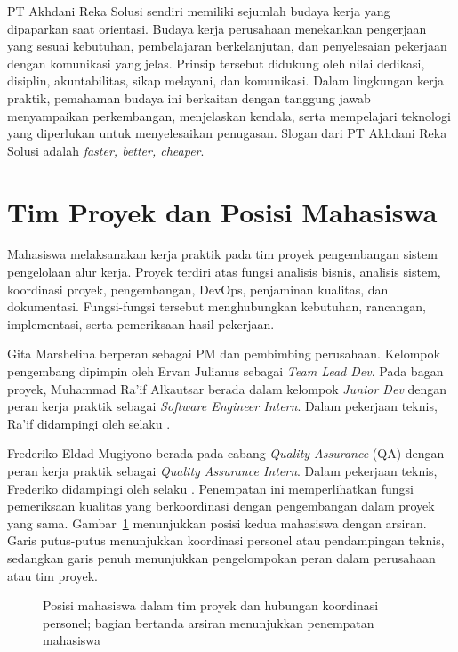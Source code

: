 PT Akhdani Reka Solusi sendiri memiliki sejumlah budaya kerja yang dipaparkan saat orientasi. Budaya kerja perusahaan menekankan pengerjaan yang sesuai kebutuhan, pembelajaran berkelanjutan, dan penyelesaian pekerjaan dengan komunikasi yang jelas. Prinsip tersebut didukung oleh nilai dedikasi, disiplin, akuntabilitas, sikap melayani, dan komunikasi. Dalam lingkungan kerja praktik, pemahaman budaya ini berkaitan dengan tanggung jawab menyampaikan perkembangan, menjelaskan kendala, serta mempelajari teknologi yang diperlukan untuk menyelesaikan penugasan. Slogan dari PT Akhdani Reka Solusi adalah \textit{faster, better, cheaper}.

\section{Tim Proyek dan Posisi Mahasiswa}\label{sec:tim-proyek}
Mahasiswa melaksanakan kerja praktik pada tim proyek pengembangan sistem pengelolaan alur kerja. Proyek terdiri atas fungsi analisis bisnis, analisis sistem, koordinasi proyek, pengembangan, DevOps, penjaminan kualitas, dan dokumentasi. Fungsi-fungsi tersebut menghubungkan kebutuhan, rancangan, implementasi, serta pemeriksaan hasil pekerjaan.

Gita Marshelina berperan sebagai PM dan pembimbing perusahaan. Kelompok pengembang dipimpin oleh Ervan Julianus sebagai \textit{Team Lead Dev}. Pada bagan proyek, Muhammad Ra'if Alkautsar berada dalam kelompok \textit{Junior Dev} dengan peran kerja praktik sebagai \textit{Software Engineer Intern}. Dalam pekerjaan teknis, Ra'if didampingi oleh \NamaPembimbingTeknis{} selaku \JabatanPembimbingTeknis{}.

Frederiko Eldad Mugiyono berada pada cabang \textit{Quality Assurance} (QA)\label{istilah:qa} dengan peran kerja praktik sebagai \textit{Quality Assurance Intern}. Dalam pekerjaan teknis, Frederiko didampingi oleh \NamaPembimbingTeknisQA{} selaku \JabatanPembimbingTeknisQA{}. Penempatan ini memperlihatkan fungsi pemeriksaan kualitas yang berkoordinasi dengan pengembangan dalam proyek yang sama. Gambar~\ref{fig:koordinasi} menunjukkan posisi kedua mahasiswa dengan arsiran. Garis putus-putus menunjukkan koordinasi personel atau pendampingan teknis, sedangkan garis penuh menunjukkan pengelompokan peran dalam perusahaan atau tim proyek.

\begin{figure}[htbp]
\centering

\caption{Posisi mahasiswa dalam tim proyek dan hubungan koordinasi personel; bagian bertanda arsiran menunjukkan penempatan mahasiswa}
\label{fig:koordinasi}
\end{figure}

